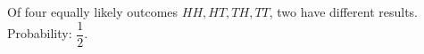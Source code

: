 Of four equally likely outcomes $HH,HT,TH,TT$, two have different results. Probability: $\boxed{\dfrac{1}{2}}$.
